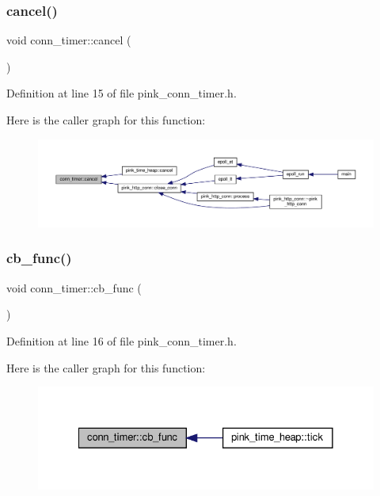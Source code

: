 \subsubsection{\texorpdfstring{cancel()}{cancel()}}
{\footnotesize\ttfamily void conn\+\_\+timer\+::cancel (\begin{DoxyParamCaption}{ }\end{DoxyParamCaption})\hspace{0.3cm}{\ttfamily [inline]}}



Definition at line 15 of file pink\+\_\+conn\+\_\+timer.\+h.

Here is the caller graph for this function\+:\nopagebreak
\begin{figure}[H]
\begin{center}
\leavevmode
\includegraphics[width=350pt]{classconn__timer_a543102358beb1bc590006310556182de_icgraph}
\end{center}
\end{figure}
\mbox{\label{classconn__timer_a86d7a0d33b7423368bba281a0d0eaab9}} 
\subsubsection{\texorpdfstring{cb\+\_\+func()}{cb\_func()}}
{\footnotesize\ttfamily void conn\+\_\+timer\+::cb\+\_\+func (\begin{DoxyParamCaption}{ }\end{DoxyParamCaption})\hspace{0.3cm}{\ttfamily [inline]}}



Definition at line 16 of file pink\+\_\+conn\+\_\+timer.\+h.

Here is the caller graph for this function\+:\nopagebreak
\begin{figure}[H]
\begin{center}
\leavevmode
\includegraphics[width=328pt]{classconn__timer_a86d7a0d33b7423368bba281a0d0eaab9_icgraph}
\end{center}
\end{figure}
\mbox{\label{classconn__timer_a6cb5ef510c4022acd31b002e15758d60}} 
